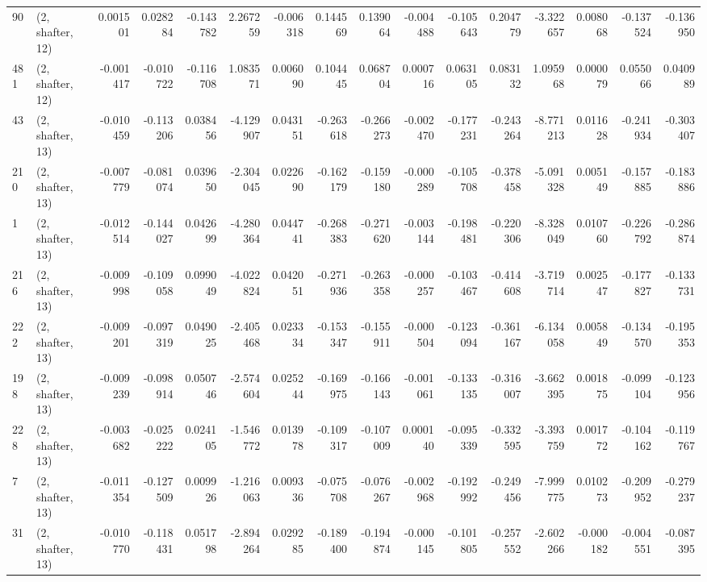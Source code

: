 \begin{tabular}{llrrrrrrrrrrrrrr}
90  &  (2, shafter, 12) &   0.001501 &  0.028284 & -0.143782 &   2.267259 & -0.006318 &   0.144569 &  0.139064 & -0.004488 & -0.105643 &  0.204779 &    -3.322657 &   0.008068 &  -0.137524 &  -0.136950 \\
481 &  (2, shafter, 12) &  -0.001417 & -0.010722 & -0.116708 &   1.083571 &  0.006090 &   0.104445 &  0.068704 &  0.000716 &  0.063105 &  0.083132 &     1.095968 &   0.000079 &   0.055066 &   0.040989 \\
43  &  (2, shafter, 13) &  -0.010459 & -0.113206 &  0.038456 &  -4.129907 &  0.043151 &  -0.263618 & -0.266273 & -0.002470 & -0.177231 & -0.243264 &    -8.771213 &   0.011628 &  -0.241934 &  -0.303407 \\
210 &  (2, shafter, 13) &  -0.007779 & -0.081074 &  0.039650 &  -2.304045 &  0.022690 &  -0.162179 & -0.159180 & -0.000289 & -0.105708 & -0.378458 &    -5.091328 &   0.005149 &  -0.157885 &  -0.183886 \\
1   &  (2, shafter, 13) &  -0.012514 & -0.144027 &  0.042699 &  -4.280364 &  0.044741 &  -0.268383 & -0.271620 & -0.003144 & -0.198481 & -0.220306 &    -8.328049 &   0.010760 &  -0.226792 &  -0.286874 \\
216 &  (2, shafter, 13) &  -0.009998 & -0.109058 &  0.099049 &  -4.022824 &  0.042051 &  -0.271936 & -0.263358 & -0.000257 & -0.103467 & -0.414608 &    -3.719714 &   0.002547 &  -0.177827 &  -0.133731 \\
222 &  (2, shafter, 13) &  -0.009201 & -0.097319 &  0.049025 &  -2.405468 &  0.023334 &  -0.153347 & -0.155911 & -0.000504 & -0.123094 & -0.361167 &    -6.134058 &   0.005849 &  -0.134570 &  -0.195353 \\
198 &  (2, shafter, 13) &  -0.009239 & -0.098914 &  0.050746 &  -2.574604 &  0.025244 &  -0.169975 & -0.166143 & -0.001061 & -0.133135 & -0.316007 &    -3.662395 &   0.001875 &  -0.099104 &  -0.123956 \\
228 &  (2, shafter, 13) &  -0.003682 & -0.025222 &  0.024105 &  -1.546772 &  0.013978 &  -0.109317 & -0.107009 &  0.000140 & -0.095339 & -0.332595 &    -3.393759 &   0.001772 &  -0.104162 &  -0.119767 \\
7   &  (2, shafter, 13) &  -0.011354 & -0.127509 &  0.009926 &  -1.216063 &  0.009336 &  -0.075708 & -0.076267 & -0.002968 & -0.192992 & -0.249456 &    -7.999775 &   0.010273 &  -0.209952 &  -0.279237 \\
31  &  (2, shafter, 13) &  -0.010770 & -0.118431 &  0.051798 &  -2.894264 &  0.029285 &  -0.189400 & -0.194874 & -0.000145 & -0.101805 & -0.257552 &    -2.602266 &  -0.000182 &  -0.004551 &  -0.087395 \\

\end{tabular}
